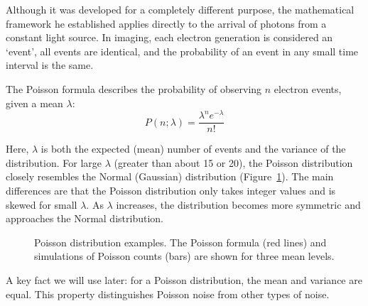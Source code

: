 \documentclass[
  letterpaper,
]{book}
\begin{document}
\begin{tcolorbox}
Although it was developed for a completely different purpose, the
mathematical framework he established applies directly to the arrival of
photons from a constant light source. In imaging, each electron
generation is considered an `event', all events are identical, and the
probability of an event in any small time interval is the same.

\end{tcolorbox}

The Poisson formula describes the probability of observing \(n\)
electron events, given a mean \(\lambda\): \[
P(n; \lambda) = \frac{\lambda^n e^{-\lambda}}{n!}
\]

Here, \(\lambda\) is both the expected (mean) number of events and the
variance of the distribution. For large \(\lambda\) (greater than about
15 or 20), the Poisson distribution closely resembles the Normal
(Gaussian) distribution (Figure~\ref{fig-sensor-poisson}). The main
differences are that the Poisson distribution only takes integer values
and is skewed for small \(\lambda\). As \(\lambda\) increases, the
distribution becomes more symmetric and approaches the Normal
distribution.

\begin{figure}


\caption{\label{fig-sensor-poisson}Poisson distribution examples. The
Poisson formula (red lines) and simulations of Poisson counts (bars) are
shown for three mean levels.}

\end{figure}%

A key fact we will use later: for a Poisson distribution, the mean and
variance are equal. This property distinguishes Poisson noise from other
types of noise.
\end{document}
